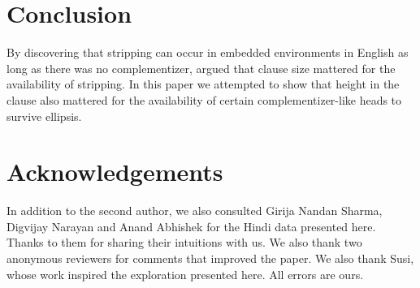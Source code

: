 \documentclass[output=paper]{langscibook}
\begin{document}
\section{Conclusion}\label{mamasect4}
By discovering that stripping can occur in embedded environments in English as long as there was no complementizer, \citet{wurmbrand17} argued that clause size mattered for the availability of stripping. In this paper we attempted to show that height in the clause also mattered for the availability of certain complementizer-like heads to survive ellipsis.


\section*{Acknowledgements}
In addition to the second author, we also consulted Girija Nandan Sharma, Digvijay Narayan and Anand Abhishek for the Hindi data presented here. Thanks to them for sharing their intuitions with us. We also thank two anonymous reviewers for comments that improved the paper. We also thank Susi, whose work inspired the exploration presented here. All errors are ours.

{\sloppy\printbibliography[heading=subbibliography,notkeyword=this]}
\end{document}

